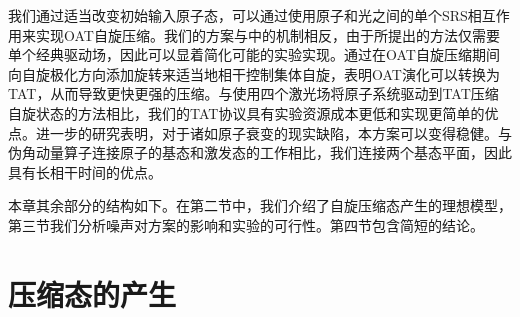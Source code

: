我们通过适当改变初始输入原子态，可以通过使用原子和光之间的单个SRS相互作用来实现OAT自旋压缩。我们的方案与\cite{PRA2002SS}中的机制相反，由于所提出的方法仅需要单个经典驱动场，因此可以显着简化可能的实验实现。通过在OAT自旋压缩期间向自旋极化方向添加旋转来适当地相干控制集体自旋，表明OAT演化可以转换为TAT，从而导致更快更强的压缩。与使用四个激光场将原子系统驱动到TAT压缩自旋状态的方法\cite{NJP2017J-Borregaard}相比，我们的TAT协议具有实验资源成本更低和实现更简单的优点。进一步的研究表明，对于诸如原子衰变的现实缺陷，本方案可以变得稳健。与伪角动量算子连接原子的基态和激发态的工作相比，我们连接两个基态平面，因此具有长相干时间的优点。

本章其余部分的结构如下。在第二节中，我们介绍了自旋压缩态产生的理想模型，第三节我们分析噪声对方案的影响和实验的可行性。第四节包含简短的结论。



\vbox{}
\section{压缩态的产生}
\vbox{}

